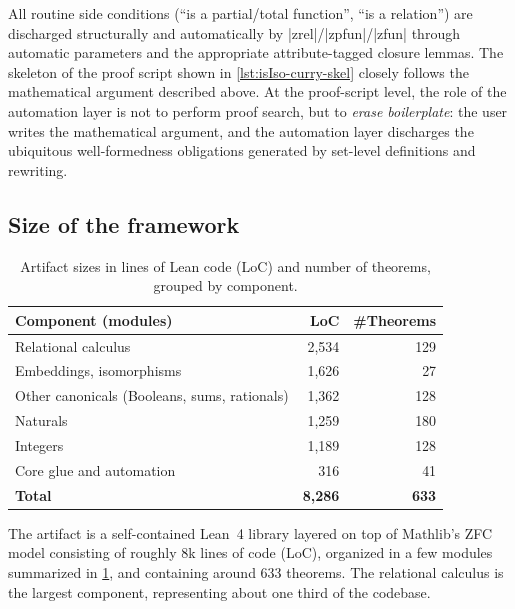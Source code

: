 All routine side conditions (``is a partial/total function'', ``is a relation'') are discharged structurally and automatically by \inlinelean|zrel|/\inlinelean|zpfun|/\inlinelean|zfun| through automatic parameters and the appropriate attribute-tagged closure lemmas.
The skeleton of the proof script shown in \cref{lst:isIso-curry-skel} closely follows the mathematical argument described above.
At the proof-script level, the role of the automation layer is not to perform proof search, but to \emph{erase boilerplate}: the user writes the mathematical argument, and the automation layer discharges the ubiquitous well-formedness obligations generated by set-level definitions and rewriting.

\subsection{Size of the framework}
\label{subsec:artifacts}

\begin{table}[t]
  \centering
  \small
  \begin{tabular}{lrr}
    \hline
    \textbf{Component (modules)}                 & \textbf{LoC}   & \textbf{\#Theorems} \\
    \hline
    Relational calculus                          & 2,534          & 129                 \\

    Embeddings, isomorphisms                     & 1,626          & 27                  \\

    Other canonicals (Booleans, sums, rationals) & 1,362          & 128                 \\

    Naturals                                     & 1,259          & 180                 \\

    Integers                                     & 1,189          & 128                 \\

    Core glue and automation                     & 316            & 41                   \\
    \hline
    \textbf{Total}                               & \textbf{8,286} & \textbf{633}        \\
    \hline
  \end{tabular}
  \caption{Artifact sizes in lines of Lean code (LoC) and number of theorems, grouped by component.}
  \label{tab:artifacts-loc}
\end{table}

The artifact is a self-contained Lean~4 library layered on top of Mathlib's ZFC model consisting of roughly 8k lines of code (LoC), organized in a few modules summarized in \cref{tab:artifacts-loc}, and containing around 633 theorems.
The relational calculus is the largest component, representing about one third of the codebase.
